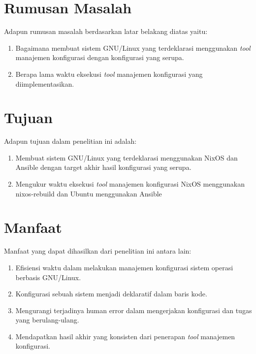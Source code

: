 \documentclass[10pt,twoside]{report}
\begin{document}
\vspace{3mm}
\section{Rumusan Masalah}
\vspace{-3mm}
\begin{adjustwidth}{0.70cm}{}
	Adapun rumusan masalah berdasarkan latar belakang diatas yaitu:
	\begin{enumerate}[leftmargin=0.45cm]
		\item Bagaimana membuat sistem GNU/Linux yang terdeklarasi menggunakan \textit{tool}
		      manajemen konfigurasi dengan konfigurasi yang serupa.
		\item Berapa lama waktu eksekusi \textit{tool} manajemen konfigurasi yang diimplementasikan.
	\end{enumerate}
\end{adjustwidth}
\section{Tujuan}
\vspace{-3mm}
\begin{adjustwidth}{0.70cm}{}
	Adapun tujuan dalam penelitian ini adalah:
	\begin{enumerate}[leftmargin=0.45cm]
		\item Membuat sistem GNU/Linux yang terdeklarasi menggunakan NixOS dan
		      Ansible dengan target akhir hasil konfigurasi yang serupa.
		\item Mengukur waktu eksekusi \textit{tool} manajemen konfigurasi NixOS menggunakan nixos-rebuild
		      dan Ubuntu menggunakan Ansible
	\end{enumerate}
\end{adjustwidth}
\vspace{3mm}
\section{Manfaat}
\vspace{-3mm}
\begin{adjustwidth}{0.70cm}{}
	Manfaat yang dapat dihasilkan dari penelitian ini antara lain:
	\begin{enumerate}[leftmargin=0.45cm]
		\item Efisiensi waktu dalam melakukan manajemen konfigurasi sistem operasi berbasis GNU/Linux.
		\item Konfigurasi sebuah sistem menjadi deklaratif dalam baris kode.
		\item Mengurangi terjadinya human error dalam mengerjakan konfigurasi dan tugas yang berulang-ulang.
		\item Mendapatkan hasil akhir yang konsisten dari penerapan \textit{tool} manajemen konfigurasi.
	\end{enumerate}
\end{adjustwidth}
\vspace{3mm}
\end{document}
